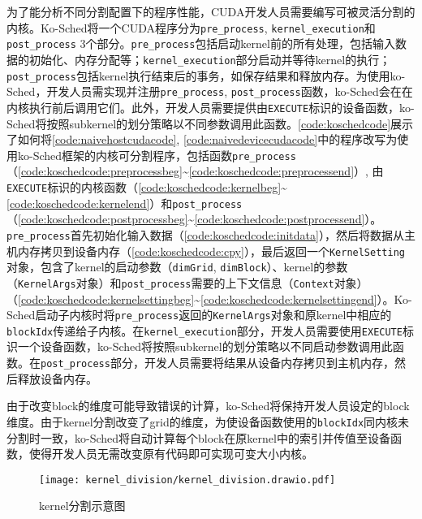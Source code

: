 为了能分析不同分割配置下的程序性能，CUDA开发人员需要编写可被灵活分割的内核。Ko-Sched将一个CUDA程序分为\texttt{pre\_process}, \texttt{kernel\_execution}和\texttt{post\_process} 3个部分。\texttt{pre\_process}包括启动kernel前的所有处理，包括输入数据的初始化、内存分配等；\texttt{kernel\_execution}部分启动并等待kernel的执行；\texttt{post\_process}包括kernel执行结束后的事务，如保存结果和释放内存。为使用ko-Sched，开发人员需实现并注册\texttt{pre\_process}, \texttt{post\_process}函数，ko-Sched会在在内核执行前后调用它们。此外，开发人员需要提供由\texttt{EXECUTE}标识的设备函数，ko-Sched将按照subkernel的划分策略以不同参数调用此函数。\autoref{code:koschedcode}展示了如何将\autoref{code:naivehostcudacode}, \autoref{code:naivedevicecudacode}中的程序改写为使用ko-Sched框架的内核可分割程序，包括函数\texttt{pre\_process}（\autoref{code:koschedcode:preprocessbeg}\textasciitilde\autoref{code:koschedcode:preprocessend}）, 由\texttt{EXECUTE}标识的内核函数（\autoref{code:koschedcode:kernelbeg}\textasciitilde\autoref{code:koschedcode:kernelend}）和\texttt{post\_process}（\autoref{code:koschedcode:postprocessbeg}\textasciitilde\autoref{code:koschedcode:postprocessend}）。\texttt{pre\_process}首先初始化输入数据（\autoref{code:koschedcode:initdata}），然后将数据从主机内存拷贝到设备内存（\autoref{code:koschedcode:cpy}），最后返回一个\texttt{KernelSetting}对象，包含了kernel的启动参数（\texttt{dimGrid}, \texttt{dimBlock}）、kernel的参数（\texttt{KernelArgs}对象）和\texttt{post\_process}需要的上下文信息（\texttt{Context}对象）（\autoref{code:koschedcode:kernelsettingbeg}\textasciitilde\autoref{code:koschedcode:kernelsettingend}）。Ko-Sched启动子内核时将\texttt{pre\_process}返回的\texttt{KernelArgs}对象和原kernel中相应的\texttt{blockIdx}传递给子内核。在\texttt{kernel\_execution}部分，开发人员需要使用\texttt{EXECUTE}标识一个设备函数，ko-Sched将按照subkernel的划分策略以不同启动参数调用此函数。在\texttt{post\_process}部分，开发人员需要将结果从设备内存拷贝到主机内存，然后释放设备内存。

由于改变block的维度可能导致错误的计算，ko-Sched将保持开发人员设定的block维度。由于kernel分割改变了grid的维度，为使设备函数使用的\texttt{blockIdx}同内核未分割时一致，ko-Sched将自动计算每个block在原kernel中的索引并传值至设备函数，使得开发人员无需改变原有代码即可实现可变大小内核。

\begin{figure}[htbp]
    \centering
    \texttt{[image: kernel\_division/kernel\_division.drawio.pdf]}
    \caption{kernel分割示意图}
    \label{kernel-division}
\end{figure}

